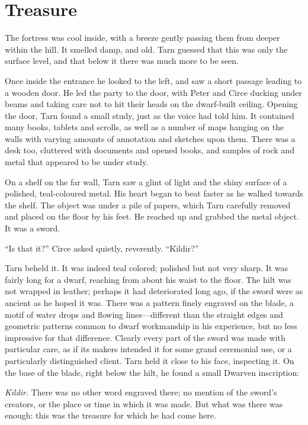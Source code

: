 \chapter{Treasure}

The fortress was cool inside, with a breeze gently passing them from deeper within the hill.  It smelled damp, and old.  Tarn guessed that this was only the surface level, and that below it there was much more to be seen.

Once inside the entrance he looked to the left, and saw a short passage leading to a wooden door.  He led the party to the door, with Peter and Circe ducking under beams and taking care not to hit their heads on the dwarf-built ceiling.  Opening the door, Tarn found a small study, just as the voice had told him.  It contained many books, tablets and scrolls, as well as a number of maps hanging on the walls with varying amounts of annotation and sketches upon them.  There was a desk too, cluttered with documents and opened books, and samples of rock and metal that appeared to be under study.

On a shelf on the far wall, Tarn saw a glint of light and the shiny surface of a polished, teal-coloured metal.  His heart began to beat faster as he walked towards the shelf.  The object was under a pile of papers, which Tarn carefully removed and placed on the floor by his feet.  He reached up and grabbed the metal object.  It was a sword.

``Is that it?'' Circe asked quietly, reverently.  ``K\=\i{}ldir?''

Tarn beheld it.  It was indeed teal colored; polished but not very sharp.  It was fairly long for a dwarf, reaching from about his waist to the floor.  The hilt was not wrapped in leather; perhaps it had deteriorated long ago, if the sword were as ancient as he hoped it was.  There was a pattern finely engraved on the blade, a motif of water drops and flowing lines---different than the straight edges and geometric patterns common to dwarf workmanship in his experience, but no less impressive for that difference.  Clearly every part of the sword was made with particular care, as if its makers intended it for some grand ceremonial use, or a particularly distinguished client.  Tarn held it close to his face, inspecting it.  On the base of the blade, right below the hilt, he found a small Dwarven inscription:


\emph{K\=\i{}ldir}.  There was no other word engraved there; no mention of the sword's creators, or the place or time in which it was made.  But what was there was enough: this was the treasure for which he had come here.

